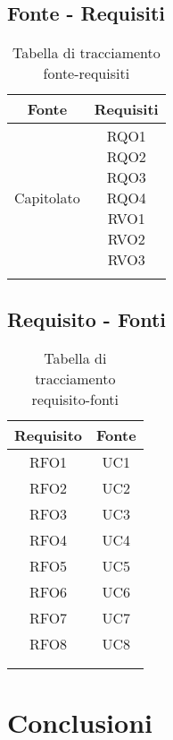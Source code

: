 \subsection{Fonte - Requisiti}
\begin{table}[H]
  \centering
  \begin{tabular}{|c|c|}
    \hline
    \rowcolor[HTML]{036400}
    {\color[HTML]{FFFFFF} Fonte} & {\color[HTML]{FFFFFF} Requisiti} \\ \hline
    \rowcolor[HTML]{EFEFEF}
    Capitolato & \req{RQO1 \\ RQO2 \\ RQO3 \\ RQO4 \\ RVO1 \\ RVO2 \\ RVO3} \\ \hline
    \rowcolor[HTML]{C0C0C0}
    &  \\ \hline
  \end{tabular}
  \caption{Tabella di tracciamento fonte-requisiti}
\end{table}

\subsection{Requisito - Fonti}
\begin{table}[H]
  \centering
  \begin{tabular}{|c|c|}
    \hline
    \rowcolor[HTML]{036400}
    {\color[HTML]{FFFFFF} Requisito} & {\color[HTML]{FFFFFF} Fonte} \\ \hline
    \rowcolor[HTML]{EFEFEF}
    RFO1 & UC1 \\ \hline
    \rowcolor[HTML]{C0C0C0}
    RFO2 & UC2 \\ \hline
    \rowcolor[HTML]{EFEFEF}
    RFO3 & UC3 \\ \hline
    \rowcolor[HTML]{C0C0C0}
    RFO4 & UC4 \\ \hline
    \rowcolor[HTML]{EFEFEF}
    RFO5 & UC5 \\ \hline
    \rowcolor[HTML]{C0C0C0}
    RFO6 & UC6 \\ \hline
    \rowcolor[HTML]{EFEFEF}
    RFO7 & UC7 \\ \hline
    \rowcolor[HTML]{C0C0C0}
    RFO8 & UC8 \\ \hline
    \rowcolor[HTML]{EFEFEF}
    &  \\ \hline
    \rowcolor[HTML]{C0C0C0}
    &  \\ \hline
  \end{tabular}
  \caption{Tabella di tracciamento requisito-fonti}
\end{table}

\section{Conclusioni}
